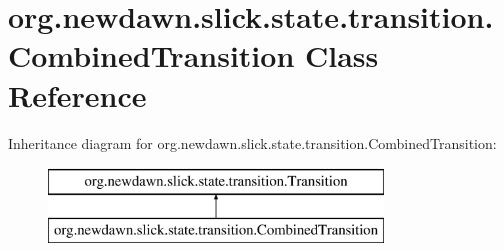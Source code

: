 \hypertarget{classorg_1_1newdawn_1_1slick_1_1state_1_1transition_1_1_combined_transition}{}\section{org.\+newdawn.\+slick.\+state.\+transition.\+Combined\+Transition Class Reference}
\label{classorg_1_1newdawn_1_1slick_1_1state_1_1transition_1_1_combined_transition}
Inheritance diagram for org.\+newdawn.\+slick.\+state.\+transition.\+Combined\+Transition\+:\begin{figure}[H]
\begin{center}
\leavevmode
\includegraphics[height=2.000000cm]{classorg_1_1newdawn_1_1slick_1_1state_1_1transition_1_1_combined_transition}
\end{center}
\end{figure}
